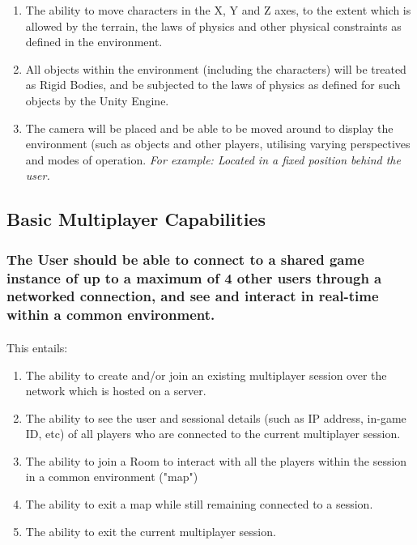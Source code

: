 \documentclass{article}
\begin{document}
\begin{enumerate}
  \item The ability to move characters in the X, Y and Z axes, to the extent which is allowed by the terrain, the laws of physics and other physical constraints as defined in the environment.
  \item All objects within the environment (including the characters) will be treated as Rigid Bodies, and be subjected to the laws of physics as defined for such objects by the Unity Engine.
  \item The camera will be placed and be able to be moved around to display the environment (such as objects and other players, utilising varying perspectives and modes of operation.
  \newline\textit{For example: Located in a fixed position behind the user.}
\end{enumerate}

\subsection{Basic Multiplayer Capabilities}
\subsubsection{\textbf{The User should be able to connect to a shared game instance of up to a maximum of 4 other users through a networked connection, and see and interact in real-time within a common environment.}}
\paragraph{}This entails:

\begin{enumerate}
  \item The ability to create and/or join an existing multiplayer session over the network which is hosted on a server.
  \item The ability to see the user and sessional details (such as IP address, in-game ID, etc) of all players who are connected to the current multiplayer session.
  \item The ability to join a Room to interact with all the players within the session in a common environment ("map")
  \item The ability to exit a map while still remaining connected to a session.
  \item The ability to exit the current multiplayer session.
\end{enumerate}
\end{document}
